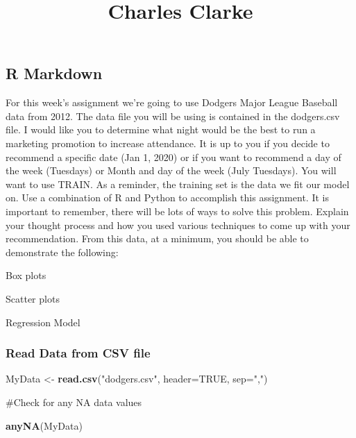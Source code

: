 \documentclass[]{article}
\title{Charles Clarke}
\author{}
\date{}
\newenvironment{Shaded}{\begin{snugshade}}{\end{snugshade}}
\newcommand{\DataTypeTok}[1]{\textcolor[rgb]{0.13,0.29,0.53}{#1}}
\newcommand{\KeywordTok}[1]{\textcolor[rgb]{0.13,0.29,0.53}{\textbf{#1}}}
\newcommand{\NormalTok}[1]{#1}
\newcommand{\OtherTok}[1]{\textcolor[rgb]{0.56,0.35,0.01}{#1}}
\newcommand{\StringTok}[1]{\textcolor[rgb]{0.31,0.60,0.02}{#1}}
\begin{document}
\maketitle

\hypertarget{r-markdown}{%
\subsection{R Markdown}\label{r-markdown}}

For this week's assignment we're going to use Dodgers Major League
Baseball data from 2012. The data file you will be using is contained in
the dodgers.csv file. I would like you to determine what night would be
the best to run a marketing promotion to increase attendance. It is up
to you if you decide to recommend a specific date (Jan 1, 2020) or if
you want to recommend a day of the week (Tuesdays) or Month and day of
the week (July Tuesdays). You will want to use TRAIN. As a reminder, the
training set is the data we fit our model on. Use a combination of R and
Python to accomplish this assignment. It is important to remember, there
will be lots of ways to solve this problem. Explain your thought process
and how you used various techniques to come up with your recommendation.
From this data, at a minimum, you should be able to demonstrate the
following:

Box plots

Scatter plots

Regression Model

\hypertarget{read-data-from-csv-file}{%
\subsubsection{Read Data from CSV file}\label{read-data-from-csv-file}}

\begin{Shaded}
\begin{Highlighting}[]
\NormalTok{MyData <-}\StringTok{ }\KeywordTok{read.csv}\NormalTok{(}\StringTok{"dodgers.csv"}\NormalTok{, }\DataTypeTok{header=}\OtherTok{TRUE}\NormalTok{, }\DataTypeTok{sep=}\StringTok{","}\NormalTok{)}
\end{Highlighting}
\end{Shaded}

\#Check for any NA data values

\begin{Shaded}
\begin{Highlighting}[]
\KeywordTok{anyNA}\NormalTok{(MyData)}
\end{Highlighting}
\end{Shaded}
\end{document}
